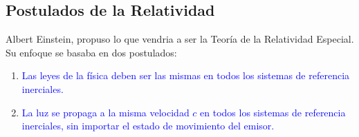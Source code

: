 \documentclass[../main]{subfiles}
\begin{document}
\begin{adjustwidth}{0pt}{-100pt}
        \section{Postulados de la Relatividad}\label{sec:postulados}
            Albert Einstein, propuso lo que vendria a ser la Teoría de la Relatividad Especial. Su enfoque se basaba en dos postulados:
            \begin{enumerate}
                \item \textcolor{blue}{Las leyes de la física deben ser las mismas en todos los sistemas de referencia inerciales.}
                \item \textcolor{blue}{La luz se propaga a la misma velocidad $c$ en todos los sistemas de referencia inerciales, sin importar el estado de movimiento del emisor.}
            \end{enumerate}
        \end{adjustwidth}
\end{document}
